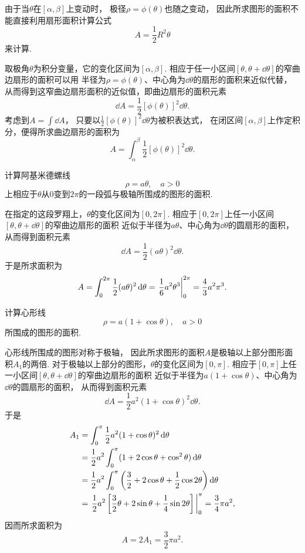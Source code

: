由于当\(\theta\)在\([\alpha,\beta]\)上变动时，
极径\(\rho=\phi(\theta)\)也随之变动，
因此所求图形的面积不能直接利用扇形面积计算公式\[
    A = \frac{1}{2} R^2 \theta
\]来计算.

取极角\(\theta\)为积分变量，它的变化区间为\([\alpha,\beta]\).
相应于任一小区间\([\theta,\theta+\dd{\theta}]\)的窄曲边扇形的面积可以用
半径为\(\rho=\phi(\theta)\)、中心角为\(\dd{\theta}\)的扇形的面积来近似代替，
从而得到这窄曲边扇形面积的近似值，即曲边扇形的面积元素\begin{equation}
    \dd{A}
    = \frac{1}{2} [\phi(\theta)]^2 \dd{\theta}.
\end{equation}
考虑到\(A = \int \dd{A}\)，
只要以\(\frac{1}{2} [\phi(\theta)]^2 \dd{\theta}\)为被积表达式，
在闭区间\([\alpha,\beta]\)上作定积分，便得所求曲边扇形的面积为\begin{equation}
	A = \int_\alpha^\beta \frac{1}{2} [\phi(\theta)]^2 \dd{\theta}.
\end{equation}

\begin{example}
计算阿基米德螺线\[
	\rho = a \theta, \quad a>0
\]上相应于\(\theta\)从\(0\)变到\(2\pi\)的一段弧与极轴所围成的图形的面积.
\begin{solution}
在指定的这段罗翔上，\(\theta\)的变化区间为\([0,2\pi]\).
相应于\([0,2\pi]\)上任一小区间\([\theta,\theta+\dd{\theta}]\)的窄曲边扇形的面积
近似于半径为\(a \theta\)、中心角为\(\dd{\theta}\)的圆扇形的面积，
从而得到面积元素\[
	\dd{A} = \frac12 (a \theta)^2 \dd{\theta}.
\]
于是所求面积为\[
	A = \int_0^{2\pi} \frac12 (a \theta)^2 \dd{\theta}
	= \eval{\frac16 a^2 \theta^3}_0^{2\pi}
	= \frac43 a^2 \pi^3.
\]
\end{solution}
\end{example}

\begin{example}
计算心形线\[
	\rho = a (1 + \cos\theta), \quad a>0
\]所围成的图形的面积.
\begin{solution}
心形线所围成的图形对称于极轴，
因此所求图形的面积\(A\)是极轴以上部分图形面积\(A_1\)的两倍.
对于极轴以上部分的图形，\(\theta\)的变化区间为\([0,\pi]\).
相应于\([0,\pi]\)上任一小区间\([\theta,\theta+\dd{\theta}]\)的窄曲边扇形的面积
近似于半径为\(a (1 + \cos\theta)\)、中心角为\(\dd{\theta}\)的圆扇形的面积，
从而得到面积元素\[
	\dd{A} = \frac12 a^2 (1 + \cos\theta)^2 \dd{\theta}.
\]
于是\begin{align*}
	A_1 &= \int_0^\pi \frac12 a^2 (1 + \cos\theta)^2 \dd{\theta} \\
	&= \frac12 a^2 \int_0^\pi (1 + 2\cos\theta + \cos^2\theta) \dd{\theta} \\
	&= \frac12 a^2 \int_0^\pi \left(\frac32 + 2 \cos\theta + \frac12 \cos2\theta\right) \dd{\theta} \\
	&= \eval{\frac12 a^2 \left[\frac32 \theta + 2 \sin\theta + \frac14 \sin2\theta\right]}_0^\pi
	= \frac34 \pi a^2,
\end{align*}
因而所求面积为\[
	A = 2 A_1 = \frac32 \pi a^2.
\]
\end{solution}
\end{example}

